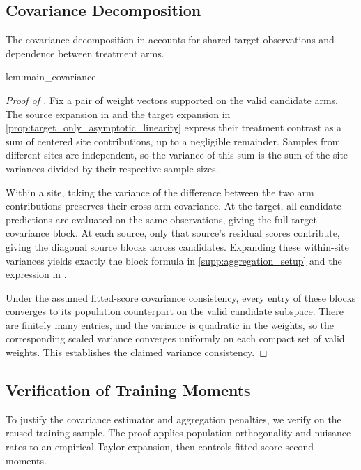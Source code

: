\documentclass[12pt]{article}
\begin{document}
\subsection{Covariance Decomposition}\label{supp:joint_training_moments}
The covariance decomposition in  accounts for shared target observations and dependence between treatment arms.

\begin{restatedmain}{lem:main_covariance}
\FACEHDJointCovariance
\end{restatedmain}
\label{proof:main_covariance}
\begin{proof}[Proof of ]
Fix a pair of weight vectors supported on the valid candidate arms. The source expansion in  and the target expansion in \cref{prop:target_only_asymptotic_linearity} express their treatment contrast as a sum of centered site contributions, up to a negligible remainder. Samples from different sites are independent, so the variance of this sum is the sum of the site variances divided by their respective sample sizes.

Within a site, taking the variance of the difference between the two arm contributions preserves their cross-arm covariance. At the target, all candidate predictions are evaluated on the same observations, giving the full target covariance block. At each source, only that source's residual scores contribute, giving the diagonal source blocks across candidates. Expanding these within-site variances yields exactly the block formula in \cref{supp:aggregation_setup} and the expression in .

Under the assumed fitted-score covariance consistency, every entry of these blocks converges to its population counterpart on the valid candidate subspace. There are finitely many entries, and the variance is quadratic in the weights, so the corresponding scaled variance converges uniformly on each compact set of valid weights. This establishes the claimed variance consistency.
\end{proof}

\subsection{Verification of Training Moments}\label{supp:training_verification}
To justify the covariance estimator and aggregation penalties, we verify  on the reused training sample. The proof applies population orthogonality and nuisance rates to an empirical Taylor expansion, then controls fitted-score second moments.
\end{document}
